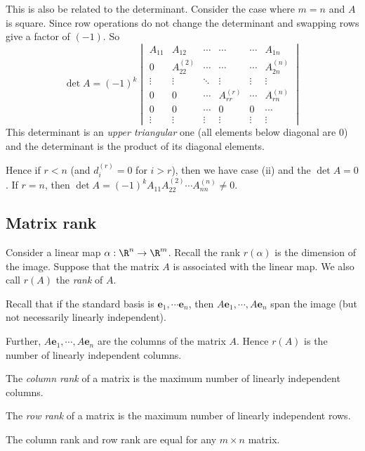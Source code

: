 \documentclass[a4paper]{article}
\begin{document}
This is also be related to the determinant. Consider the case where $m = n$ and $A$ is square. Since row operations do not change the determinant and swapping rows give a factor of $(-1)$. So
\[
  \det A  = (-1)^k
  \begin{vmatrix}
    A_{11} &A_{12}&\cdots& \cdots& \cdots & A_{1n}\\
    0 & A_{22}^{(2)} &\cdots& \cdots & \cdots & A_{2n}^{(n)} \\
    \vdots & \vdots &\ddots & \vdots & \vdots & \vdots\\
    0 & 0 & \cdots & A_{rr}^{(r)} & \cdots & A_{rn}^{(n)}\\
    0 & 0 & \cdots & 0 & 0 & \cdots\\
    \vdots & \vdots & \vdots & \vdots & \vdots & \vdots
  \end{vmatrix}
\]
This determinant is an \emph{upper triangular} one (all elements below diagonal are $0$) and the determinant is the product of its diagonal elements.

Hence if $r < n$ (and $d_i^{(r)} = 0$ for $i > r$), then we have case (ii) and the $\det A = 0$. If $r = n$, then $\det A = (-1)^k A_{11}A_{22}^{(2)}\cdots A_{nn}^{(n)} \not= 0$.

\subsection{Matrix rank}
Consider a linear map $\alpha: \R^n\to \R^m$. Recall the rank $r(\alpha)$ is the dimension of the image. Suppose that the matrix $A$ is associated with the linear map. We also call $r(A)$ the \emph{rank} of $A$.

Recall that if the standard basis is $\mathbf{e}_1,\cdots \mathbf{e}_n$, then $A\mathbf{e}_1, \cdots, A\mathbf{e}_n$ span the image (but not necessarily linearly independent).

Further, $A\mathbf{e}_1, \cdots, A\mathbf{e}_n$ are the columns of the matrix $A$. Hence $r(A)$ is the number of linearly independent columns.

\begin{defi}
  The \emph{column rank} of a matrix is the maximum number of linearly independent columns.

  The \emph{row rank} of a matrix is the maximum number of linearly independent rows.
\end{defi}

\begin{thm}
  The column rank and row rank are equal for any $m\times n$ matrix.
\end{thm}
\end{document}
